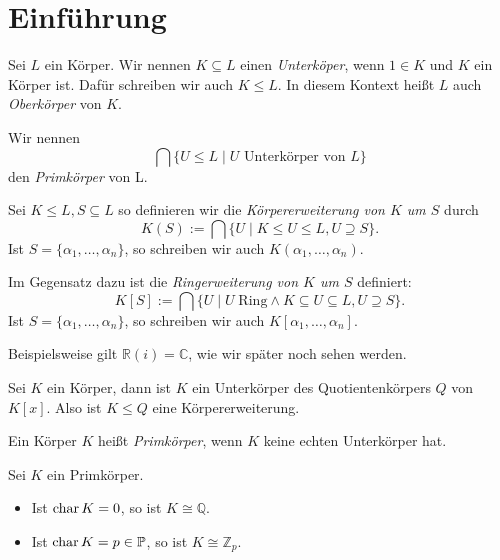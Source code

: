 \section{Einführung}

\begin{definition}
    Sei $L$ ein Körper. Wir nennen $K \subseteq L$ einen \emph{Unterköper}, wenn $1 \in K$ und $K$ ein Körper ist. Dafür schreiben wir auch $K \leq L$. In diesem Kontext heißt $L$ auch \emph{Oberkörper} von $K$.

    Wir nennen
    $$ \bigcap \{ U \leq L \mid U \text{ Unterkörper von } L \} $$
    den \emph{Primkörper} von L.

    Sei $K \leq L, S \subseteq L$ so definieren wir die \emph{Körpererweiterung von $K$ um $S$} durch
    $$ K(S) := \bigcap \{ U \mid K \leq U \leq L, U \supseteq S \}. $$
    Ist $S = \{ \alpha_1, \hdots, \alpha_n \}$, so schreiben wir auch $K(\alpha_1, \hdots, \alpha_n)$.
    
    Im Gegensatz dazu ist die \emph{Ringerweiterung von $K$ um $S$} definiert:
    $$ K[S] := \bigcap \{ U \mid U \;\mathrm{Ring}\land K \subseteq U \subseteq L, U \supseteq S \}. $$
    Ist $S = \{ \alpha_1, \hdots, \alpha_n \}$, so schreiben wir auch $K[\alpha_1, \hdots, \alpha_n]$.
\end{definition}

\begin{remark}
    Beispielsweise gilt $\mathbb{R}(i) = \mathbb{C}$, wie wir später noch sehen werden.
\end{remark}

\begin{remark}
    Sei $K$ ein Körper, dann ist $K$ ein Unterkörper des Quotientenkörpers $Q$ von $K[x]$. Also ist $K \leq Q$ eine Körpererweiterung.
\end{remark}

\begin{definition}
    Ein Körper $K$ heißt \emph{Primkörper}, wenn $K$ keine echten Unterkörper hat.
\end{definition}

\begin{theorem}
    Sei $K$ ein Primkörper.
    \begin{itemize}
        \item Ist $\operatorname{char} K = 0$, so ist $K \cong \mathbb{Q}$.
        \item Ist $\operatorname{char} K = p \in \mathbb{P}$, so ist $K \cong \mathbb{Z}_p$.
    \end{itemize}
\end{theorem}

